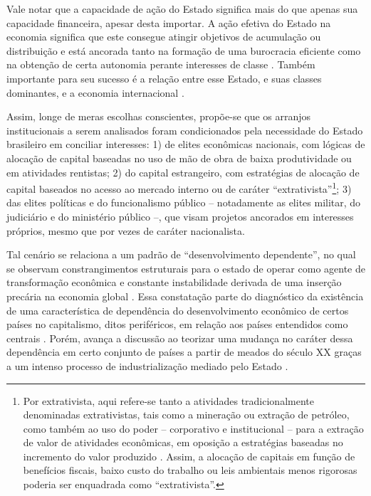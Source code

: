 Vale notar que a capacidade de ação do Estado significa mais do que
apenas sua capacidade financeira, apesar desta importar. A ação efetiva
do Estado na economia significa que este consegue atingir objetivos de
acumulação ou distribuição e está ancorada tanto na formação de uma
burocracia eficiente como na obtenção de certa autonomia perante
interesses de classe
\citep{evans_bringing_1985}. Também importante para seu sucesso é a relação entre esse
Estado, e suas classes dominantes, e a economia internacional
\citep{evans_bringing_1985}.

Assim, longe de meras escolhas conscientes, propõe-se que os arranjos
institucionais a serem analisados foram condicionados pela necessidade
do Estado brasileiro em conciliar interesses: 1) de elites econômicas
nacionais, com lógicas de alocação de capital baseadas no uso de mão de
obra de baixa produtividade ou em atividades rentistas; 2) do capital
estrangeiro, com estratégias de alocação de capital baseados no acesso
ao mercado interno ou de caráter ``extrativista''\footnote{Por
  extrativista, aqui refere-se tanto a atividades tradicionalmente
  denominadas extrativistas, tais como a mineração ou extração de
  petróleo, como também ao uso do poder -- corporativo e institucional
  -- para a extração de valor de atividades econômicas, em oposição a
  estratégias baseadas no incremento do valor produzido
  \citep{hendersonetal2002}. Assim, a alocação de capitais em função de benefícios
  fiscais, baixo custo do trabalho ou leis ambientais menos rigorosas
  poderia ser enquadrada como ``extrativista''.}; 3) das elites
políticas e do funcionalismo público -- notadamente as elites militar,
do judiciário e do ministério público --, que visam projetos ancorados
em interesses próprios, mesmo que por vezes de caráter nacionalista.

Tal cenário se relaciona a um padrão de ``desenvolvimento dependente'',
no qual se observam constrangimentos estruturais para o estado de operar
como agente de transformação econômica e constante instabilidade
derivada de uma inserção precária na economia global
\citep{evans_dependent_1979,evans_embedded_1995}.
Essa constatação parte do diagnóstico da existência de uma
característica de dependência do desenvolvimento econômico de certos
países no capitalismo, ditos periféricos, em relação aos países
entendidos como centrais
\citep{cardoso_dependencia_1970}. Porém, avança a discussão ao teorizar uma mudança no caráter
dessa dependência em certo conjunto de países a partir de meados do
século XX graças a um intenso processo de industrialização mediado pelo
Estado \citep{evans_dependent_1979}.

